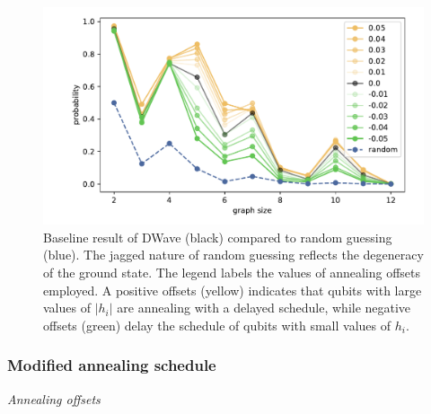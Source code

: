 \documentclass[prd,twocolumn,tightenlines,preprintnumbers,showpacs,superscriptaddress,notitlepage,nofootinbib,eqsecnum,
floatfix,longbibliography,aps,10pt]{revtex4-2}
\begin{document}
\begin{figure}
	\centering
	\includegraphics[width=\columnwidth]{./new_figures/DWave_scaling.pdf}
	\caption{Baseline result of DWave (black) compared to random guessing (blue). The jagged nature of random guessing reflects the degeneracy of the ground state. The legend labels the values of annealing offsets employed. A positive offsets (yellow) indicates that qubits with large values of $|h_i|$ are annealing with a delayed schedule, while negative offsets (green) delay the schedule of qubits with small values of $h_i$.}
	\label{fig:baseline}
\end{figure}

\subsubsection{Modified annealing schedule}

\noindent\textit{Annealing offsets}
\end{document}
